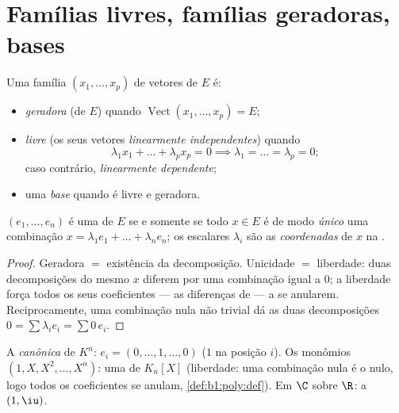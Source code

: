 \section{Famílias livres, famílias geradoras, bases}

\begin{definition}\label{def:b1:vspaces:free}
Uma família $(x_1, \dots, x_p)$ de vetores de $E$ é:
\begin{itemize}
  \item \emph{geradora} (de $E$) quando
        $\operatorname{Vect}(x_1,\dots,x_p) = E$;
  \item \emph{livre} (os seus vetores
        \emph{linearmente independentes}) quando
        \[
        \lambda_1 x_1 + \dots + \lambda_p x_p = 0
        \implies \lambda_1 = \dots = \lambda_p = 0 ;
        \]
        caso contrário, \emph{linearmente dependente};
  \item uma \emph{base} quando é livre e geradora.
\end{itemize}
\end{definition}

\begin{proposition}[Coordenadas]\label{prop:b1:vspaces:coordinates}
$(e_1, \dots, e_n)$ é uma  de $E$ se e somente se todo $x \in E$
é de modo \emph{único} uma combinação $x = \lambda_1 e_1 + \dots +
\lambda_n e_n$; os escalares $\lambda_i$ são
as \emph{coordenadas} de $x$ na .
\end{proposition}

\begin{proof}
Geradora $=$ existência da decomposição. Unicidade $=$ liberdade:
duas decomposições do mesmo $x$ diferem por uma combinação igual a
$0$; a liberdade força todos os seus coeficientes --- as diferenças
de  --- a se anularem. Reciprocamente, uma combinação nula
não trivial dá as duas decomposições $0 = \sum \lambda_i
e_i = \sum 0\,e_i$.
\end{proof}

\begin{example}\label{ex:b1:vspaces:bases}
A \emph{ canônica} de $K^n$: $e_i = (0, \dots, 1, \dots, 0)$
($1$ na posição $i$). Os monômios $(1, X, X^2, \dots, X^n)$: uma 
de $K_n[X]$ (liberdade: uma combinação nula é o  nulo, logo
todos os coeficientes se anulam, \cref{def:b1:poly:def}). Em
$\C$ sobre $\R$: a  $(1, \iu)$.
\end{example}

